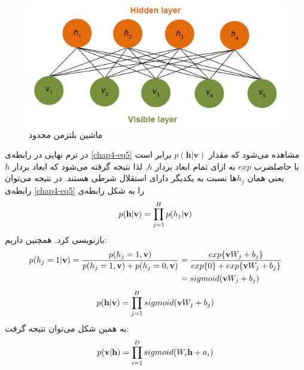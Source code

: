 \begin{figure}[!t]
	\centering
	\includegraphics[scale=0.5]{chap4-img/RBM}
	\caption{ماشین بلتزمن محدود}
	\label{chap4-fig1}
\end{figure}

در ترم نهایی در رابطه‌ی
\ref{chap4-eq5}
مشاهده می‌شود که مقدار
$p(\textbf{h}|\textbf{v})$
برابر است با حاصلضرب
$exp$
به ازای تمام ابعاد بردار
$h$,
لذا نتیجه گرفته می‌‌شود که ابعاد بردار
$h$ 
یعنی‌ همان
$h_j$ها
نسبت به یکدیگر دارای استقلال شرطی هستند. در نتیجه می‌توان رابطه‌ی
\ref{chap4-eq5}
را به شکل رابطه‌ی
\begin{align}
	\centering
	\label{chap4-eq6}
	p(\textbf{h}|\textbf{v})=\prod_{j=1}^{H}p(h_j|\textbf{v})	
\end{align}
بازنویسی کرد. همچنین داریم:
\begin{align}
	\centering
	\label{chap4-eq7}
	p(h_j = 1|\textbf{v})=\dfrac{p(h_j=1,\textbf{v})}{p(h_j=1,\textbf{v})+ p(h_j=0,\textbf{v})}
						 &=\dfrac{exp\{\textbf{v}W_j + b_j\}}{exp\{0\} + exp\{\textbf{v}W_j + b_j\}}\\\nonumber
						 &=sigmoid(\textbf{v}W_j + b_j)
\end{align}
\begin{align}
	\centering
	\label{chap4-eq8}
	p(\textbf{h}|\textbf{v})=\prod_{j=1}^{H}sigmoid(\textbf{v}W_j + b_j)
\end{align}
به همین شکل می‌‌توان نتیجه گرفت:
\begin{align}
	\centering
	\label{chap4-eq9}
	p(\textbf{v}|\textbf{h})=\prod_{i=1}^{D}sigmoid(W_i\textbf{h} + a_i)
\end{align}

